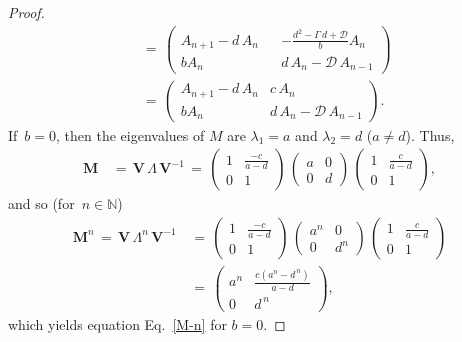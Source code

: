 \documentclass{article}
\theoremstyle{example}
\theoremstyle{plain}
\theoremstyle{definition}
\theoremstyle{remark}
\def\eqref#1{equation~\ref{#1}}
\def\mM{{\bm{M}}}
\def\mV{{\bm{V}}}
\renewcommand{\eqref}[1]{Eq.~\ref{#1}}
\newcommand{\QED}{}
\begin{document}
\begin{proof}
\begin{align}
%
& \, = \, \begin{pmatrix}
A_{n+1} -d\,A_n & & -\frac{d^2-\Gamma\,d+\mathcal{D}}{b} A_n \\[1ex]
%
b A_n & &  d\,A_n - \mathcal{D}\, A_{n-1}
\end{pmatrix}
%
%
\\[2ex]\label{}
%
&
 \, = \, \begin{pmatrix}
A_{n+1} -d\,A_n & c\, A_n \\[1ex]
%
b A_n &  d\,A_n - \mathcal{D}\, A_{n-1}
\end{pmatrix}.
\end{align}
\endgroup
If $\,b=0$, then the eigenvalues of $M$ are $\lambda_1=a$ and $\lambda_2=d$ ($a \neq d$). Thus,
\begin{align}\label{}
%
\mM &\, = \, \mV \, \Lambda \, \mV^{-1} \, = \, 
\begin{pmatrix}
1 & \frac{-c}{a-d} \\[1ex]
0 & 1
\end{pmatrix}
\, 
\begin{pmatrix}
a & 0 \\[1ex]
0 & d
\end{pmatrix}
\,
\begin{pmatrix}
1 & \frac{c}{a-d} \\[1ex]
0 & 1 
\end{pmatrix},
%
\end{align}
and so (for $\,n \in \mathbb{N}$)
\begingroup
\allowdisplaybreaks
\begin{align}\nonumber
\mM^n \, = \, \mV \, \Lambda^n \, \mV^{-1} & \, = \,
\begin{pmatrix}
1 & \frac{-c}{a-d} \\[1ex]
0 & 1
\end{pmatrix}
\, 
\begin{pmatrix}
a^n & 0 \\[1ex]
0 & d^n
\end{pmatrix}
\,
\begin{pmatrix}
1 & \frac{c}{a-d} \\[1ex]
0 & 1 
\end{pmatrix}
%
\\[1ex]\label{M-n-0}
%
&\, = \, \begin{pmatrix}
a^n & \frac{c(a^n-d^{\,n})}{a-d} \\[1ex]
%
0 &  d^{\,n}
\end{pmatrix}, 
\end{align}
\endgroup
which yields equation \eqref{M-n} for $b=0$. \QED
\end{proof}
\end{document}
